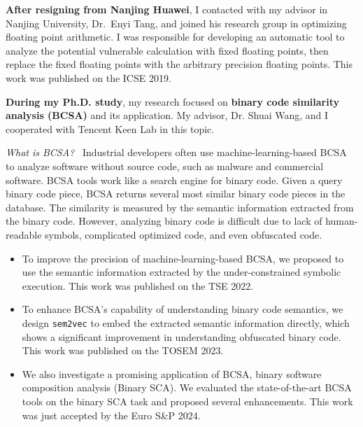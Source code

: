 
\textbf{After resigning from Nanjing Huawei}, I contacted with my advisor in
Nanjing University, Dr.\ Enyi Tang, and joined his research group
in optimizing floating point arithmetic.
I was responsible for developing an automatic tool to analyze
the potential vulnerable calculation with fixed floating points,
then replace the fixed floating points with the arbitrary precision
floating points.
This work was published on the ICSE 2019.

\smallskip
\textbf{During my Ph.D. study}, my research focused on \textbf{binary code similarity
analysis (BCSA)} and its application.
My advisor, Dr. Shuai Wang, and I cooperated with Tencent Keen Lab
in this topic.

\smallskip
\textit{What is BCSA?}~
Industrial developers often use machine-learning-based BCSA to analyze
software without source code, such as malware and commercial software.
BCSA tools work like a search engine for binary code. Given a query binary
code piece, BCSA returns several most similar binary code pieces in the
database. The similarity is measured by the semantic information extracted
from the binary code. However, analyzing binary code is difficult due to
lack of human-readable symbols, complicated optimized code, and even
obfuscated code.

\begin{itemize}
    \item To improve the precision of machine-learning-based BCSA, we proposed
    to use the semantic information extracted by the under-constrained
    symbolic execution. This work was published on the TSE 2022.

    \item To enhance BCSA's capability of understanding binary code semantics,
    we design \texttt{sem2vec} to embed the extracted semantic information
    directly, which shows a significant improvement in understanding
    obfuscated binary code. This work was published on the TOSEM 2023.

    \item We also investigate a promising application of BCSA, binary software
    composition analysis (Binary SCA). We evaluated the state-of-the-art BCSA tools
    on the binary SCA task and proposed several enhancements. This work was
    just accepted by the Euro S\&P 2024.
\end{itemize}
